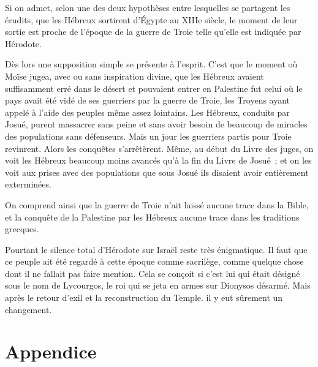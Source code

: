 \documentclass[french,twoside]{book} %
\newcommand\chapteropen{} %
\newcommand\chapterclose{} %
\begin{document}
Si on admet, selon une des deux hypothèses entre lesquelles se partagent les érudits, que les Hébreux sortirent d'Égypte au XIIIe siècle, le moment de leur sortie est proche de l'époque de la guerre de Troie telle qu'elle est indiquée par Hérodote.\par
Dès lors une supposition simple se présente à l'esprit. C'est que le moment où Moïse jugea, avec ou sans inspiration divine, que les Hébreux avaient suffisamment erré dans le désert et pouvaient entrer en Palestine fut celui où le pays avait été vidé de ses guerriers par la guerre de Troie, les Troyens ayant appelé à l'aide des peuples même assez lointains. Les Hébreux, conduits par Josué, purent massacrer sans peine et sans avoir besoin de beaucoup de miracles des populations sans défenseurs. Mais un jour les guerriers partis pour Troie revinrent. Alors les conquêtes s'arrêtèrent. Même, au début du Livre des juges, on voit les Hébreux beaucoup moins avancés qu'à la fin du Livre de Josué ; et on les voit aux prises avec des populations que sous Josué ils disaient avoir entièrement exterminées.\par
On comprend ainsi que la guerre de Troie n'ait laissé aucune trace dans la Bible, et la conquête de la Palestine par les Hébreux aucune trace dans les traditions grecques.\par
Pourtant le silence total d'Hérodote sur Israël reste très énigmatique. Il faut que ce peuple ait été regardé à cette époque comme sacrilège, comme quelque chose dont il ne fallait pas faire mention. Cela se conçoit si c'est lui qui était désigné sous le nom de Lycourgos, le roi qui se jeta en armes sur Dionysos désarmé. Mais après le retour d'exil et la reconstruction du Temple. il y eut sûrement un changement.\par

\begin{center}
\noindent \centerline{}
\end{center}

\chapterclose

\chapterclose


\chapteropen
\part[{Appendice}]{Appendice}\renewcommand{\leftmark}{Appendice}
\end{document}
